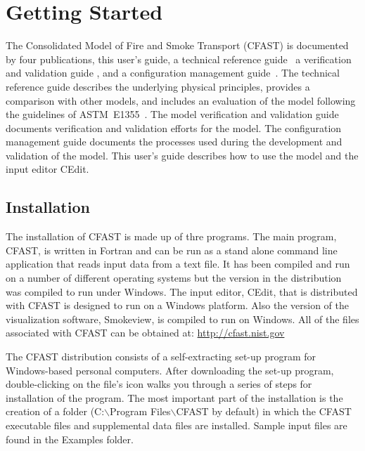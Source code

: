 
\chapter{Getting Started}

The Consolidated Model of Fire and Smoke Transport (CFAST) is documented by four publications, this user's guide, a technical reference guide~\cite{CFAST_Tech_Guide_7} a verification and validation guide \cite{CFAST_Valid_Guide_7}, and a configuration management guide~\cite{CFAST_Config_Guide_7}. The technical reference guide describes the underlying physical principles, provides a comparison with other models, and includes an evaluation of the model following the guidelines of ASTM~E1355~\cite{CFAST:ASTM:E1355}. The model verification and validation guide documents verification and validation efforts for the model. The configuration management guide documents the processes used during the development and validation of the model. This user's guide describes how to use the model and the input editor CEdit.

\section{Installation}

The installation of CFAST is made up of thre programs. The main program, CFAST, is written in Fortran and can be run as a stand alone command line application that reads input data from a text file. It has been compiled and run on a number of different operating systems but the version in the distribution was compiled to run under Windows. The input editor, CEdit, that is distributed with CFAST is designed to run on a Windows platform. Also the version of the visualization software, Smokeview, is compiled to run on Windows. All of the files associated with CFAST can be obtained at: \url{http://cfast.nist.gov}

The CFAST distribution consists of a self-extracting set-up program for Windows-based personal computers. After downloading the set-up program, double-clicking on the file's icon walks you through a series of steps for installation of the program.  The most important part of the installation is the creation of a folder ({\ct C:$\backslash$Program Files$\backslash$CFAST} by default) in which the CFAST executable files and supplemental data files are installed.  Sample input files are found in the {\ct Examples} folder.

